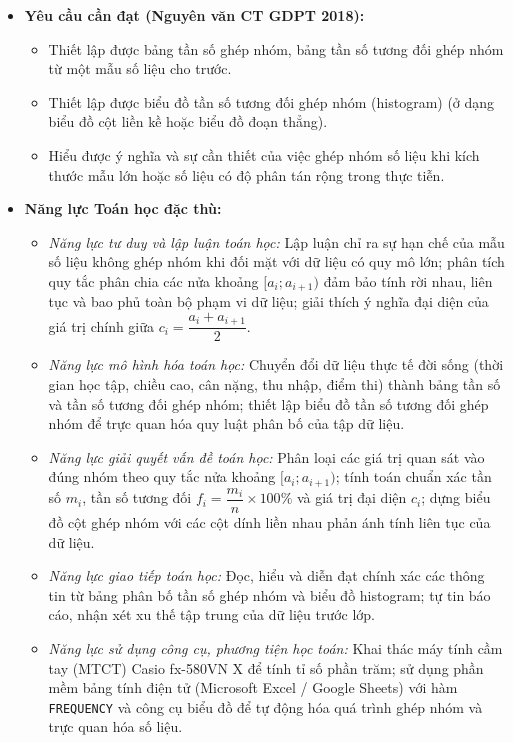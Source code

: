 \documentclass[12pt, a4paper]{article}
\begin{document}
\begin{itemize}[leftmargin=1.2cm]
    \item \textbf{Yêu cầu cần đạt (Nguyên văn CT GDPT 2018):}
    \begin{itemize}[leftmargin=0.6cm]
        \item Thiết lập được bảng tần số ghép nhóm, bảng tần số tương đối ghép nhóm từ một mẫu số liệu cho trước.
        \item Thiết lập được biểu đồ tần số tương đối ghép nhóm (histogram) (ở dạng biểu đồ cột liền kề hoặc biểu đồ đoạn thẳng).
        \item Hiểu được ý nghĩa và sự cần thiết của việc ghép nhóm số liệu khi kích thước mẫu lớn hoặc số liệu có độ phân tán rộng trong thực tiễn.
    \end{itemize}

    \item \textbf{Năng lực Toán học đặc thù:}
    \begin{itemize}[leftmargin=0.6cm]
        \item \textit{Năng lực tư duy và lập luận toán học:} Lập luận chỉ ra sự hạn chế của mẫu số liệu không ghép nhóm khi đối mặt với dữ liệu có quy mô lớn; phân tích quy tắc phân chia các nửa khoảng $[a_i; a_{i+1})$ đảm bảo tính rời nhau, liên tục và bao phủ toàn bộ phạm vi dữ liệu; giải thích ý nghĩa đại diện của giá trị chính giữa $c_i = \dfrac{a_i + a_{i+1}}{2}$.
        \item \textit{Năng lực mô hình hóa toán học:} Chuyển đổi dữ liệu thực tế đời sống (thời gian học tập, chiều cao, cân nặng, thu nhập, điểm thi) thành bảng tần số và tần số tương đối ghép nhóm; thiết lập biểu đồ tần số tương đối ghép nhóm để trực quan hóa quy luật phân bố của tập dữ liệu.
        \item \textit{Năng lực giải quyết vấn đề toán học:} Phân loại các giá trị quan sát vào đúng nhóm theo quy tắc nửa khoảng $[a_i; a_{i+1})$; tính toán chuẩn xác tần số $m_i$, tần số tương đối $f_i = \dfrac{m_i}{n} \times 100\%$ và giá trị đại diện $c_i$; dựng biểu đồ cột ghép nhóm với các cột dính liền nhau phản ánh tính liên tục của dữ liệu.
        \item \textit{Năng lực giao tiếp toán học:} Đọc, hiểu và diễn đạt chính xác các thông tin từ bảng phân bố tần số ghép nhóm và biểu đồ histogram; tự tin báo cáo, nhận xét xu thế tập trung của dữ liệu trước lớp.
        \item \textit{Năng lực sử dụng công cụ, phương tiện học toán:} Khai thác máy tính cầm tay (MTCT) Casio fx-580VN X để tính tỉ số phần trăm; sử dụng phần mềm bảng tính điện tử (Microsoft Excel / Google Sheets) với hàm \texttt{FREQUENCY} và công cụ biểu đồ để tự động hóa quá trình ghép nhóm và trực quan hóa số liệu.
    \end{itemize}


\end{itemize}
\end{document}
